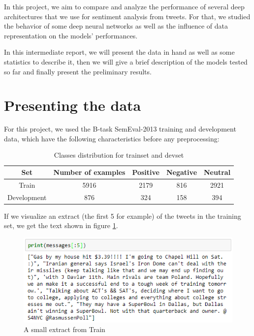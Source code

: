 \documentclass[a4paper,english,12pt]{article}
\begin{document}
In this project, we aim to compare and analyze the performance of several deep architectures that we use for sentiment analysis from tweets. For that, we studied the behavior of some deep neural networks as well as the influence of data representation on the models' performances. 

In this intermediate report, we will present the data in hand as well as some statistics to describe it, then we will give a brief description of the models tested so far and finally present the preliminary results. 

\section{Presenting the data}
For this project, we used the B-task SemEval-2013 training and development data, which have the following characteristics before any preprocessing:

\begin{table}[H]\centering
\begin{tabular}{|c|c|c|c|c|}

\hline
Set & Number of examples & Positive & Negative & Neutral\\
\hline
Train & 5916 & 2179 & 816 & 2921\\
\hline
Development & 876 & 324 & 158 & 394\\
\hline

\end{tabular}
\caption{Classes distribution for trainset and devset}
\end{table}

If we visualize an extract (the first 5 for example) of the tweets in the training set, we get the text shown in figure \ref{extract}.

\begin{figure}[h!]
\centering
\includegraphics[scale=1]{extract}
\caption{A small extract from Train}
\label{extract}
\end{figure}
\end{document}
